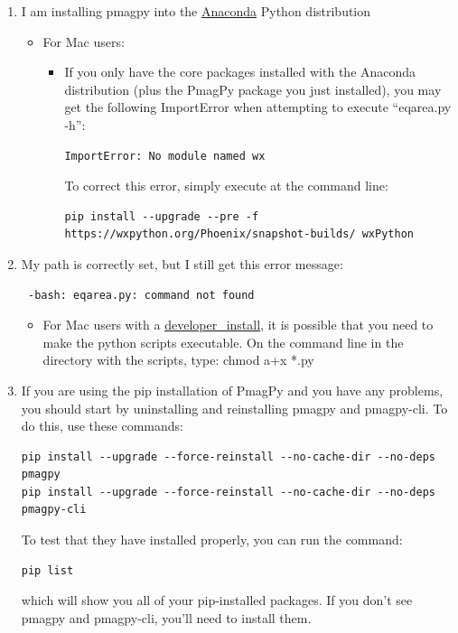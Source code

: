 \documentclass[11pt]{book}
\begin{document}
{{{{{{\begin{enumerate}
\begin{itemize}
\end {itemize}

\item I am installing pmagpy into the \href{https://www.continuum.io/downloads}{Anaconda} Python distribution

\begin{itemize}
\item For Mac users:
\begin{itemize}
\item If you only have the core packages installed with the Anaconda distribution (plus the PmagPy package you just installed), you may get the following ImportError when attempting to execute ``eqarea.py -h'':

\begin{verbatim}
ImportError: No module named wx
\end{verbatim}

To correct this error, simply execute at the command line:
\begin{verbatim}
pip install --upgrade --pre -f https://wxpython.org/Phoenix/snapshot-builds/ wxPython
\end{verbatim}
\end{itemize}
\end{itemize}

\item  My path is correctly set, but I still get this error message: \begin{verbatim} -bash: eqarea.py: command not found
\end{verbatim}

  \begin{itemize}
  \item  For Mac users with a \href{#developer_install}{developer_install}, it is possible that you need to make the python scripts executable. On the command line in the directory with the scripts, type: chmod a+x *.py
  \end{itemize}

\item
  If you are using the pip installation of PmagPy and you have any problems, you should start by uninstalling and reinstalling pmagpy and pmagpy-cli.  To do this, use these commands:
\begin{verbatim}
pip install --upgrade --force-reinstall --no-cache-dir --no-deps pmagpy
pip install --upgrade --force-reinstall --no-cache-dir --no-deps pmagpy-cli
\end{verbatim}
To test that they have installed properly, you can run the command:
\begin{verbatim}
pip list
\end{verbatim}
which will show you all of your pip-installed packages.  If you don't see pmagpy and pmagpy-cli, you'll need to install them.


\end{enumerate}}}}}}}
\end{document}
